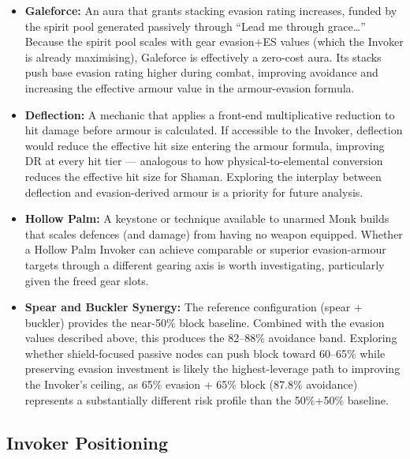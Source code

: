 \documentclass[12pt, letterpaper]{article}
\newcommand{\namedsubsection}[1]{%
    \subsection*{#1}%
    \addcontentsline{toc}{subsection}{#1}%
}
\begin{document}
\begin{itemize}
    \item \textbf{Galeforce:} An aura that grants stacking evasion rating increases, funded by the spirit pool generated passively through ``Lead me through grace\ldots'' Because the spirit pool scales with gear evasion+ES values (which the Invoker is already maximising), Galeforce is effectively a zero-cost aura. Its stacks push base evasion rating higher during combat, improving avoidance and increasing the effective armour value in the armour-evasion formula.

    \item \textbf{Deflection:} A mechanic that applies a front-end multiplicative reduction to hit damage before armour is calculated. If accessible to the Invoker, deflection would reduce the effective hit size entering the armour formula, improving DR at every hit tier --- analogous to how physical-to-elemental conversion reduces the effective hit size for Shaman. Exploring the interplay between deflection and evasion-derived armour is a priority for future analysis.

    \item \textbf{Hollow Palm:} A keystone or technique available to unarmed Monk builds that scales defences (and damage) from having no weapon equipped. Whether a Hollow Palm Invoker can achieve comparable or superior evasion-armour targets through a different gearing axis is worth investigating, particularly given the freed gear slots.

    \item \textbf{Spear and Buckler Synergy:} The reference configuration (spear + buckler) provides the near-50\% block baseline. Combined with the evasion values described above, this produces the 82--88\% avoidance band. Exploring whether shield-focused passive nodes can push block toward 60--65\% while preserving evasion investment is likely the highest-leverage path to improving the Invoker's ceiling, as 65\% evasion + 65\% block (87.8\% avoidance) represents a substantially different risk profile than the 50\%+50\% baseline.
\end{itemize}

\namedsubsection{Invoker Positioning}
\end{document}
